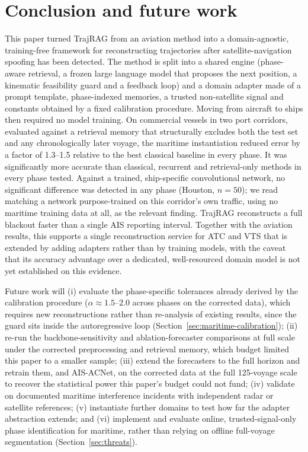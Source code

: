 \section{Conclusion and future work}
\label{sec:conclusion}

This paper turned TrajRAG from an aviation method into a domain-agnostic,
training-free framework for reconstructing trajectories after
satellite-navigation spoofing has been detected. The method is split into a
shared engine (phase-aware retrieval, a frozen large language model that
proposes the next position, a kinematic feasibility guard and a feedback
loop) and a domain adapter made of a prompt template, phase-indexed
memories, a trusted non-satellite signal and constants obtained by a fixed
calibration procedure. Moving from aircraft to ships then required no model
training. On commercial vessels in two port corridors, evaluated against a
retrieval memory that structurally excludes both the test set and any
chronologically later voyage, the maritime instantiation reduced error by a
factor of 1.3--1.5 relative to the best classical baseline in every phase.
It was significantly more accurate than classical, recurrent and
retrieval-only methods in every phase tested. Against a trained,
ship-specific convolutional network, no significant difference was detected
in any phase (Houston, $n=50$); we read matching a network purpose-trained
on this corridor's own traffic, using no maritime training data at all, as
the relevant finding. TrajRAG reconstructs a full blackout faster than a
single AIS reporting interval. Together with the aviation results, this
supports a single reconstruction service for ATC and VTS that is extended
by adding adapters rather than by training models, with the caveat that its
accuracy advantage over a dedicated, well-resourced domain model is not yet
established on this evidence.

Future work will (i) evaluate the phase-specific tolerances already derived
by the calibration procedure ($\alpha \approx 1.5$--2.0 across phases on the
corrected data), which requires new reconstructions rather than re-analysis
of existing results, since the guard sits inside the autoregressive loop
(Section~\ref{sec:maritime-calibration}); (ii) re-run the backbone-sensitivity
and ablation-forecaster comparisons at full scale under the corrected
preprocessing and retrieval memory, which budget limited this paper to a
smaller sample; (iii) extend the forecasters to the full horizon and
retrain them, and AIS-ACNet, on the corrected data at the full 125-voyage
scale to recover the statistical power this paper's budget could not fund;
(iv) validate on documented maritime interference incidents with
independent radar or satellite references; (v) instantiate further domains
to test how far the adapter abstraction extends; and (vi) implement and
evaluate online, trusted-signal-only phase identification for maritime,
rather than relying on offline full-voyage segmentation
(Section~\ref{sec:threats}).

